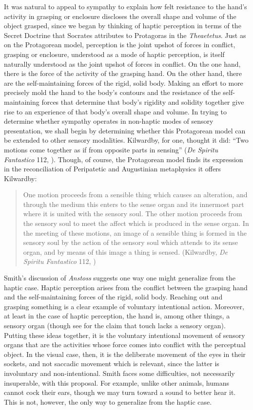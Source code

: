 It was natural to appeal to sympathy to explain how felt resistance to the hand's activity in grasping or enclosure discloses the overall shape and volume of the object grasped, since we began by thinking of haptic perception in terms of the Secret Doctrine that Socrates attributes to Protagoras in the \emph{Theaetetus}. Just as on the Protagorean model, perception is the joint upshot of forces in conflict, grasping or enclosure, understood as a mode of haptic perception, is itself naturally understood as the joint upshot of forces in conflict. On the one hand, there is the force of the activity of the grasping hand. On the other hand, there are the self-maintaining forces of the rigid, solid body. Making an effort to more precisely mold the hand to the body's contours and the resistance of the self-maintaining forces that determine that body's rigidity and solidity together give rise to an experience of that body's overall shape and volume. In trying to determine whether sympathy operates in non-haptic modes of sensory presentation, we shall begin by determining whether this Protagorean model can be extended to other sensory modalities. Kilwardby, for one, thought it did: ``Two motions come together as if from opposite parts in sensing'' (\emph{De Spiritu Fantastico} 112, \citealt[]{Broadie:1993dz}). Though, of course, the Protagorean model finds its expression in the reconciliation of Peripatetic and Augustinian metaphysics it offers Kilwardby:
\begin{quote}
	One motion proceeds from a sensible thing which causes an alteration, and through the medium this enters to the sense organ and its innermost part where it is united with the sensory soul. The other motion proceeds from the sensory soul to meet the affect which is produced in the sense organ. In the meeting of these motions, an image of a sensible thing is formed in the sensory soul by the action of the sensory soul which attends to its sense organ, and by means of this image a thing is sensed. (Kilwardby, \emph{De Spiritu Fantastico} 112, \citealt[]{Broadie:1993dz})
\end{quote}

Smith's \citeyearpar{Smith:2002sa} discussion of \emph{Anstoss} suggests one way one might generalize from the haptic case. Haptic perception arises from the conflict between the grasping hand and the self-maintaining forces of the rigid, solid body. Reaching out and grasping something is a clear example of voluntary intentional action. Moreover, at least in the case of haptic perception, the hand is, among other things, a sensory organ (though see \citealt{Paterson:2007aa} for the claim that touch lacks a sensory organ). Putting these ideas together, it is the voluntary intentional movement of sensory organs that are the activities whose force comes into conflict with the perceptual object. In the visual case, then, it is the deliberate movement of the eyes in their sockets, and not saccadic movement which is relevant, since the latter is involuntary and non-intentional. Smith faces some difficulties, not necessarily insuperable, with this proposal. For example, unlike other animals, humans cannot cock their ears, though we may turn toward a sound to better hear it. This is not, however, the only way to generalize from the haptic case. 

